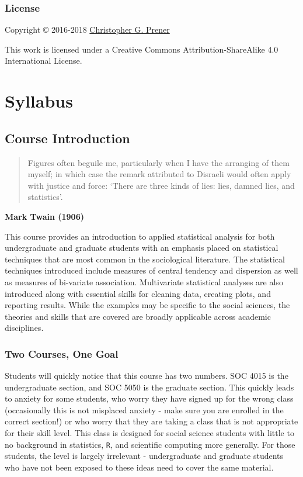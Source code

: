 \documentclass[]{book}
\theoremstyle{definition}
\theoremstyle{definition}
\theoremstyle{definition}
\theoremstyle{remark}
\begin{document}
\hypertarget{license}{%
\section*{License}\label{license}}

Copyright © 2016-2018 \href{https://chris-prener.github.io}{Christopher
G. Prener}

This work is licensed under a Creative Commons Attribution-ShareAlike
4.0 International License.

\hypertarget{part-syllabus}{%
\part{Syllabus}\label{part-syllabus}}

\hypertarget{course-introduction}{%
\chapter{Course Introduction}\label{course-introduction}}

\begin{quote}
Figures often beguile me, particularly when I have the arranging of them
myself; in which case the remark attributed to Disraeli would often
apply with justice and force: `There are three kinds of lies: lies,
damned lies, and statistics'.
\end{quote}

\textbf{Mark Twain (1906)}

This course provides an introduction to applied statistical analysis for
both undergraduate and graduate students with an emphasis placed on
statistical techniques that are most common in the sociological
literature. The statistical techniques introduced include measures of
central tendency and dispersion as well as measures of bi-variate
association. Multivariate statistical analyses are also introduced along
with essential skills for cleaning data, creating plots, and reporting
results. While the examples may be specific to the social sciences, the
theories and skills that are covered are broadly applicable across
academic disciplines.

\hypertarget{two-courses-one-goal}{%
\section{Two Courses, One Goal}\label{two-courses-one-goal}}

Students will quickly notice that this course has two numbers. SOC 4015
is the undergraduate section, and SOC 5050 is the graduate section. This
quickly leads to anxiety for some students, who worry they have signed
up for the wrong class (occasionally this is not misplaced anxiety -
make sure you are enrolled in the correct section!) or who worry that
they are taking a class that is not appropriate for their skill level.
This class is designed for social science students with little to no
background in statistics, \texttt{R}, and scientific computing more
generally. For those students, the level is largely irrelevant -
undergraduate and graduate students who have not been exposed to these
ideas need to cover the same material.
\end{document}
